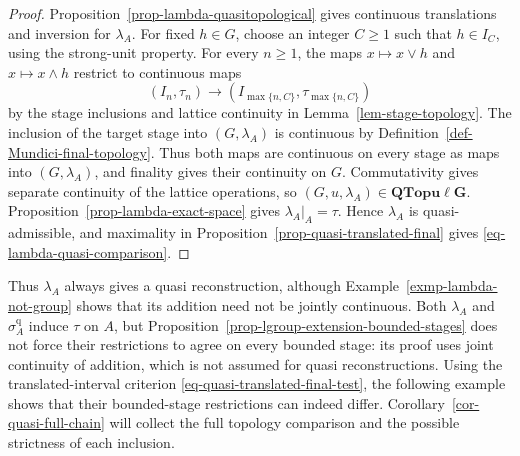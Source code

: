 \documentclass[preprint,3p]{elsarticle}
\theoremstyle{plain}
\theoremstyle{definition}
\newcommand{\QTopulg}{\mathbf{QTopu\ell G}}
\numberwithin{equation}{section}
\begin{document}
\begin{proof}
Proposition~\ref{prop-lambda-quasitopological} gives continuous
translations and inversion for $\lambda_A$.
For fixed $h\in G$, choose an integer $C\geq1$ such that
$h\in I_C$, using the strong-unit property.
For every $n\geq1$, the maps $x\mapsto x\vee h$ and
$x\mapsto x\wedge h$ restrict to continuous maps
\[
 (I_n,\tau_n)\longrightarrow
 (I_{\max\{n,C\}},\tau_{\max\{n,C\}})
\]
by the stage inclusions and lattice continuity in
Lemma~\ref{lem-stage-topology}.
The inclusion of the target stage into $(G,\lambda_A)$ is
continuous by Definition~\ref{def-Mundici-final-topology}.
Thus both maps are continuous on every stage as maps into
$(G,\lambda_A)$, and finality gives their continuity on $G$.
Commutativity gives separate continuity of the lattice operations,
so $(G,u,\lambda_A)\in\QTopulg$.
Proposition~\ref{prop-lambda-exact-space} gives
$\lambda_A|_A=\tau$.  Hence $\lambda_A$ is quasi-admissible,
and maximality in Proposition~\ref{prop-quasi-translated-final} gives
\eqref{eq-lambda-quasi-comparison}.
\end{proof}

Thus $\lambda_A$ always gives a quasi reconstruction, although
Example~\ref{exmp-lambda-not-group} shows that its addition need
not be jointly continuous.
Both $\lambda_A$ and $\sigma_A^{\mathrm q}$ induce $\tau$ on $A$,
but Proposition~\ref{prop-lgroup-extension-bounded-stages} does
not force their restrictions to agree on every bounded stage:
its proof uses joint continuity of addition, which is not
assumed for quasi reconstructions.
Using the translated-interval criterion
\eqref{eq-quasi-translated-final-test}, the following example shows
that their bounded-stage restrictions can indeed differ.
Corollary~\ref{cor-quasi-full-chain} will collect the full topology
comparison and the possible strictness of each inclusion.
\end{document}
